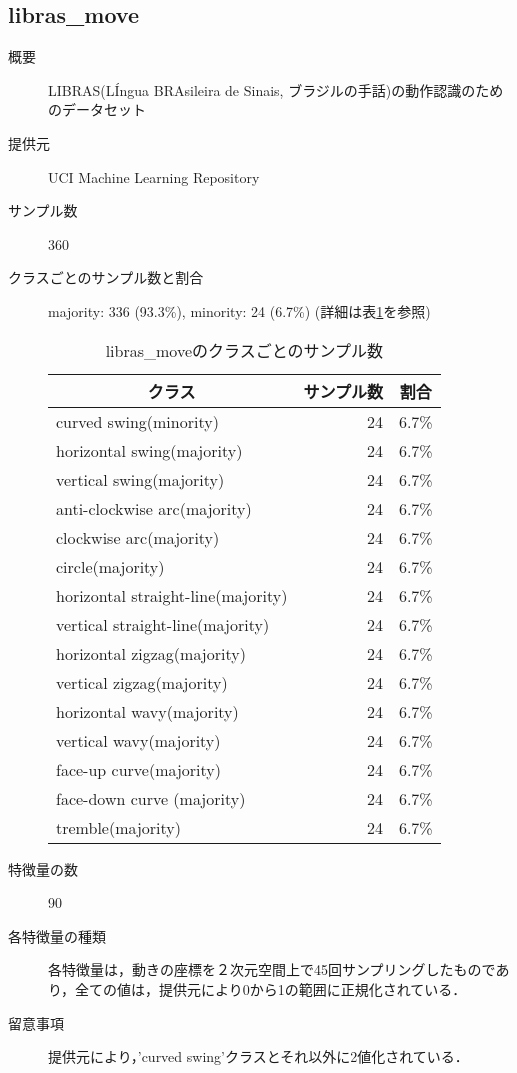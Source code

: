 \subsection{libras\_move}
\begin{description}
    \item[概要] LIBRAS(LÍngua BRAsileira de Sinais, ブラジルの手話)の動作認識のためのデータセット\cite{librasmove}
    \item[提供元] UCI Machine Learning Repository
    \item[サンプル数] 360
    \item[クラスごとのサンプル数と割合] majority: 336 (93.3\%), minority: 24 (6.7\%) (詳細は表\ref{tab:librasmove}を参照)
    \begin{table}[htbp]
        \centering
        \caption{libras\_moveのクラスごとのサンプル数}
        \label{tab:librasmove}
        \begin{tabular}{lrc} \hline
            \multicolumn{1}{c}{クラス}&
            \multicolumn{1}{c}{サンプル数}&
            \multicolumn{1}{c}{割合}\\
            \hline
            \hline
	    curved swing(minority)& 24& 6.7\% \\
		horizontal swing(majority)& 24& 6.7\% \\
		vertical swing(majority)& 24& 6.7\% \\
		anti-clockwise arc(majority)& 24& 6.7\% \\
		clockwise arc(majority)& 24& 6.7\% \\
		circle(majority)& 24& 6.7\% \\
		horizontal straight-line(majority)& 24& 6.7\% \\
		vertical straight-line(majority)& 24& 6.7\% \\
		horizontal zigzag(majority)& 24& 6.7\% \\
		vertical zigzag(majority)& 24& 6.7\% \\
		horizontal wavy(majority)& 24& 6.7\% \\
		vertical wavy(majority)& 24& 6.7\% \\
		face-up curve(majority)& 24& 6.7\% \\
		face-down curve (majority)& 24& 6.7\% \\
		tremble(majority)& 24& 6.7\% \\
        \hline
        \end{tabular}
    \end{table}

    \item[特徴量の数] 90
    \item[各特徴量の種類] \mbox{}
        各特徴量は，動きの座標を２次元空間上で45回サンプリングしたものであり，全ての値は，提供元により0から1の範囲に正規化されている．
    \item[留意事項] 提供元により，'curved swing'クラスとそれ以外に2値化されている．
\end{description}

